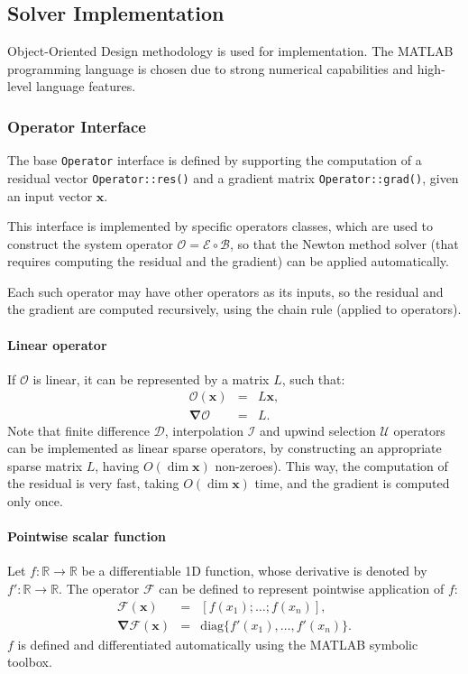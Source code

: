 \documentclass[final]{elsarticle}
\newcommand{\diag}{\ensuremath{\mathrm{diag}}}
\newcommand{\R}{\ensuremath{\mathbb{R}}}
\newcommand\bnabla{\boldsymbol{\nabla}}
\newcommand\bx{\boldsymbol{x}}
\newcommand\cB{\mathcal{B}}
\newcommand\cE{\mathcal{E}}
\newcommand\cF{\mathcal{F}}
\newcommand\cO{\mathcal{O}}
\newcommand\cI{\mathcal{I}}
\newcommand\cD{\mathcal{D}}
\begin{document}
\subsection{Solver Implementation}

Object-Oriented Design methodology is used for implementation.
The MATLAB programming language is chosen due to strong numerical capabilities
and high-level language features.

\subsubsection{Operator Interface}
The base \verb|Operator| interface is defined by 
supporting the computation of a residual vector \verb|Operator::res()|
and a gradient matrix \verb|Operator::grad()|, given an input vector $\bx$.

This interface is implemented by specific operators classes,
which are used to construct the system operator $\cO = \cE \circ \cB$, so that 
the Newton method solver (that requires computing the residual and the gradient) 
can be applied automatically.

Each such operator may have other operators as its inputs, so the residual
and the gradient are computed recursively, using the chain rule (applied to operators).

\paragraph{Linear operator}
If $\cO$ is linear, it can be represented by a matrix $L$, such that:
\begin{eqnarray*}
\cO(\bx) &=& L \bx, \\
\bnabla\cO &=& L. 
\end{eqnarray*}
Note that finite difference $\cD$, interpolation $\cI$ and 
upwind selection $\mathcal{U}$ operators
can be implemented as linear sparse operators, by constructing 
an appropriate sparse matrix $L$, having $O(\dim \bx)$ non-zeroes).
This way, the computation of the residual is very fast, taking $O(\dim \bx)$ time,
and the gradient is computed only once.

\paragraph{Pointwise scalar function}
Let $f: \R \rightarrow \R$ be a differentiable 1D function, whose derivative is
denoted by $f': \R \rightarrow \R$. The operator $\cF$ can be defined to
represent pointwise application of $f$:
\begin{eqnarray*}
\cF(\bx) &=& [f(x_1); \ldots; f(x_n)], \\
\bnabla\cF(\bx) &=& \diag\{f'(x_1), \ldots, f'(x_n)\}.
\end{eqnarray*}
$f$ is defined and differentiated automatically using the MATLAB symbolic toolbox.
\end{document}
